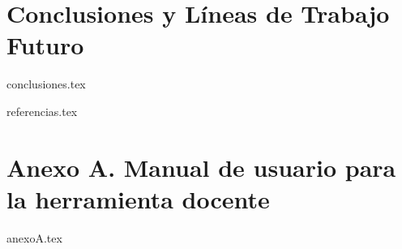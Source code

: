 \documentclass[14pt]{extreport}
\begin{document}

\chapter{Conclusiones y Líneas de Trabajo Futuro}
{conclusiones.tex}


{referencias.tex}
\fancyhead{}


\setcounter{chapter}{0}
\renewcommand\thechapter{\Alph{chapter}}

\chapter*{Anexo A. Manual de usuario para la herramienta docente} \label{anexo:html}
\fancyhead{}
{anexoA.tex}
\end{document}
